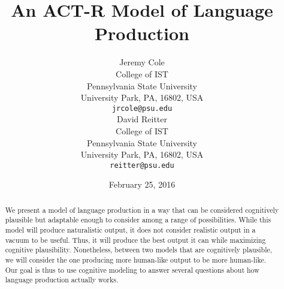 \documentclass[11pt]{article}
\title{An ACT-R Model of Language Production}
\author{Jeremy Cole \\
College of IST \\
Pennsylvania State University \\
University Park, PA, 16802, USA \\
  {\tt jrcole@psu.edu} \\ \And
David Reitter \\
College of IST \\
Pennsylvania State University \\
University Park, PA, 16802, USA \\
  {\tt reitter@psu.edu} \\
}
\date{February 25, 2016}
\begin{document}
\maketitle
\begin{abstract}
We present a model of language production in a way that can be considered cognitively plausible but adaptable enough to consider among a range of possibilities. While this model will produce naturalistic output, it does not consider realistic output in a vacuum to be useful. Thus, it will produce the best output it can while maximizing cognitive plausibility. Nonetheless, between two models that are cognitively plausible, we will consider the one producing more human-like output to be more human-like. Our goal is thus to use cognitive modeling to answer several questions about how language production actually works.
\end{abstract}









\end{document}
